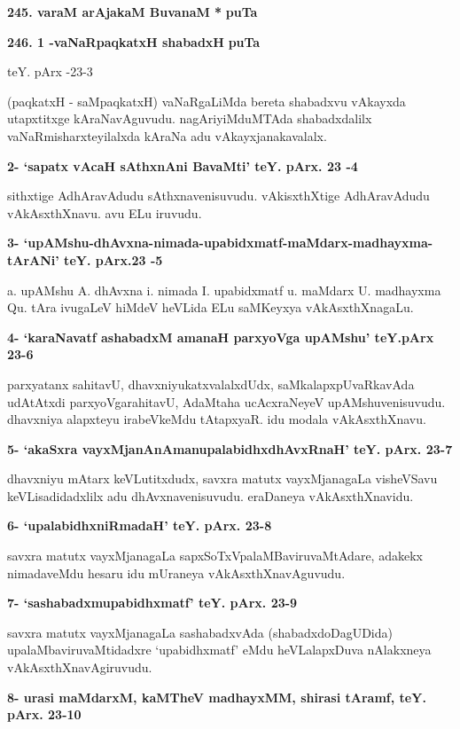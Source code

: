 \medskip
\noindent
\textbf{245. varaM arAjakaM BuvanaM *} \hfill{\bf puTa \pageref{94}}

\medskip
\noindent
\textbf{246. 1 -vaNaRpaqkatxH shabadxH} \hfill{\bf puTa \pageref{153}}

\hfill{teY. pArx -23-3}

\smallskip
(paqkatxH - saMpaqkatxH) vaNaRgaLiMda bereta shabadxvu vAkayxda utapxtitxge kAraNavAgu\-vudu. nagAri\-yiMduM\-TAda shabadxdalilx vaNaRmisharxteyilalxda kAraNa adu vAkayxjanakavalalx.

\medskip
\noindent
\textbf{2- `sapatx vAcaH sAthxnAni BavaMti' teY. pArx. 23 -4}

\smallskip
sithxtige AdhAravAdudu sAthxnavenisuvudu. vAkisxthXtige AdhAravAdudu vAkAsxthXnavu. avu ELu iru\-vudu.


\medskip
\noindent
\textbf{3- `upAMshu-dhAvxna-nimada-upabidxmatf-maMdarx-madhayxma-tArANi' teY. pArx.23 -5}

\smallskip
a. upAMshu A. dhAvxna i. nimada I. upabidxmatf u. maMdarx U. madhayxma Qu. tAra ivu\-gaLeV hiMdeV heVLida ELu saMKeyxya vAkAsxthXnagaLu.

\medskip
\noindent
\textbf{4- `karaNavatf ashabadxM amanaH parxyoVga upAMshu' teY.pArx 23-6}

\smallskip
parxyatanx sahitavU, dhavxniyukatxvalalxdUdx, saMkalapxpUvaRkavAda udAtAtxdi parxyoVgarahitavU, AdaM\-taha ucAcxraNeyeV upAMshuvenisuvudu. dhavxniya alapxteyu irabeVkeMdu tAtapxyaR. idu modala vAkAsxthXnavu.

\eject

\noindent
\textbf{5- `akaSxra vayxMjanAnAmanupalabidhxdhAvxRnaH' teY. pArx. 23-7}

\smallskip
dhavxniyu mAtarx keVLutitxdudx, savxra matutx vayxMjanagaLa visheVSavu keVLisadidadxlilx adu dhAvxnavenisuvudu. eraDaneya vAkAsxthXnavidu.

\medskip
\noindent
\textbf{6- `upalabidhxniRmadaH' teY. pArx. 23-8}

\smallskip
savxra matutx vayxMjanagaLa sapxSoTxVpalaMBaviruvaMtAdare, adakekx nimadaveMdu hesaru idu mUra\-neya vAkAsxthXnavAguvudu.


\medskip
\noindent
\textbf{7- `sashabadxmupabidhxmatf' teY. pArx. 23-9}

\smallskip
savxra matutx vayxMjanagaLa sashabadxvAda (shabadxdoDagUDida) upalaMbaviruvaMtidadxre `upabidhxmatf' eMdu heVLalapxDuva nAlakxneya vAkAsxthXnavAgiruvudu.

\medskip
\noindent
\textbf{8- urasi maMdarxM, kaMTheV madhayxMM, shirasi tAramf, teY. pArx. 23-10}

